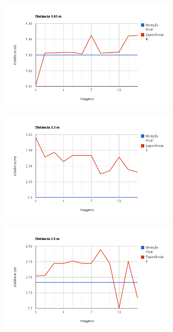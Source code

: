 \begin{figure}
\begin{center}
	\includegraphics[width=0.80\textwidth]{figures/experiencia/chart_4.png}
	\label{fig:chart_4}
\end{center}
\end{figure}

\begin{figure}
\begin{center}
	\includegraphics[width=0.80\textwidth]{figures/experiencia/chart_5.png}
	\label{fig:chart_5}
\end{center}
\end{figure}

\begin{figure}
\begin{center}
	\includegraphics[width=0.80\textwidth]{figures/experiencia/chart_6.png}
	\label{fig:chart_6}
\end{center}
\end{figure}

